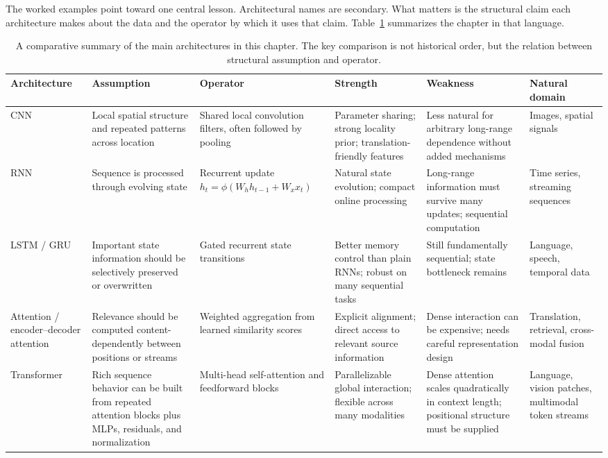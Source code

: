The worked examples point toward one central lesson.
Architectural names are secondary.
What matters is the structural claim each architecture makes about the data and the operator by which it uses that claim.
Table~\ref{tab:arch-compare} summarizes the chapter in that language.

\begin{table}[ht]
\centering
\scriptsize
\setlength{\tabcolsep}{4pt}
\begin{tabular}{|p{}|p{}|p{}|p{}|p{}|p{}|}
\hline
\textbf{Architecture} & \textbf{Assumption} & \textbf{Operator} & \textbf{Strength} & \textbf{Weakness} & \textbf{Natural domain} \\
\hline
CNN & Local spatial structure and repeated patterns across location & Shared local convolution filters, often followed by pooling & Parameter sharing; strong locality prior; translation-friendly features & Less natural for arbitrary long-range dependence without added mechanisms & Images, spatial signals \\
\hline
RNN & Sequence is processed through evolving state & Recurrent update $h_t=\phi(W_hh_{t-1}+W_xx_t)$ & Natural state evolution; compact online processing & Long-range information must survive many updates; sequential computation & Time series, streaming sequences \\
\hline
LSTM / GRU & Important state information should be selectively preserved or overwritten & Gated recurrent state transitions & Better memory control than plain RNNs; robust on many sequential tasks & Still fundamentally sequential; state bottleneck remains & Language, speech, temporal data \\
\hline
Attention / encoder--decoder attention & Relevance should be computed content-dependently between positions or streams & Weighted aggregation from learned similarity scores & Explicit alignment; direct access to relevant source information & Dense interaction can be expensive; needs careful representation design & Translation, retrieval, cross-modal fusion \\
\hline
Transformer & Rich sequence behavior can be built from repeated attention blocks plus MLPs, residuals, and normalization & Multi-head self-attention and feedforward blocks & Parallelizable global interaction; flexible across many modalities & Dense attention scales quadratically in context length; positional structure must be supplied & Language, vision patches, multimodal token streams \\
\hline
\end{tabular}
\caption{A comparative summary of the main architectures in this chapter. The key comparison is not historical order, but the relation between structural assumption and operator.}
\label{tab:arch-compare}
\end{table}

